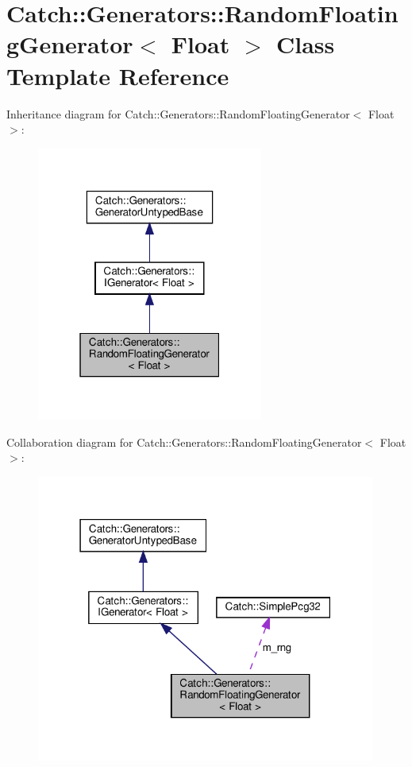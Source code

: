 \hypertarget{classCatch_1_1Generators_1_1RandomFloatingGenerator}{}\section{Catch\+:\+:Generators\+:\+:Random\+Floating\+Generator$<$ Float $>$ Class Template Reference}
\label{classCatch_1_1Generators_1_1RandomFloatingGenerator}


Inheritance diagram for Catch\+:\+:Generators\+:\+:Random\+Floating\+Generator$<$ Float $>$\+:
\nopagebreak
\begin{figure}[H]
\begin{center}
\leavevmode
\includegraphics[width=211pt]{classCatch_1_1Generators_1_1RandomFloatingGenerator__inherit__graph}
\end{center}
\end{figure}


Collaboration diagram for Catch\+:\+:Generators\+:\+:Random\+Floating\+Generator$<$ Float $>$\+:
\nopagebreak
\begin{figure}[H]
\begin{center}
\leavevmode
\includegraphics[width=316pt]{classCatch_1_1Generators_1_1RandomFloatingGenerator__coll__graph}
\end{center}
\end{figure}
